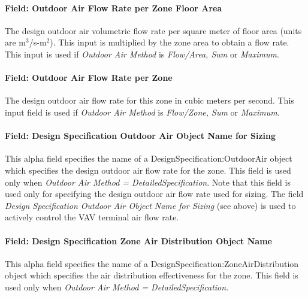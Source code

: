 \paragraph{Field: Outdoor Air Flow Rate per Zone Floor Area}\label{field-outdoor-air-flow-rate-per-zone-floor-area-10}

The design outdoor air volumetric flow rate per square meter of floor area (units are m\(^{3}\)/s-m\(^{2}\)). This input is multiplied by the zone area to obtain a flow rate. This input is used if \emph{Outdoor Air Method} is \emph{Flow/Area, Sum} or \emph{Maximum}.

\paragraph{Field: Outdoor Air Flow Rate per Zone}\label{field-outdoor-air-flow-rate-per-zone-10}

The design outdoor air flow rate for this zone in cubic meters per second. This input field is used if \emph{Outdoor Air Method} is \emph{Flow/Zone, Sum} or \emph{Maximum}.

\paragraph{Field: Design Specification Outdoor Air Object Name for Sizing}\label{field-design-specification-outdoor-air-object-name-for-sizing-1}

This alpha field specifies the name of a DesignSpecification:OutdoorAir object which specifies the design outdoor air flow rate for the zone. This field is used only when \emph{Outdoor Air Method = DetailedSpecification}. Note that this field is used only for specifying the design outdoor air flow rate used for sizing. The field \emph{Design Specification Outdoor Air Object Name for Sizing} (see above) is used to actively control the VAV terminal air flow rate.

\paragraph{Field: Design Specification Zone Air Distribution Object Name}\label{field-design-specification-zone-air-distribution-object-name-9}

This alpha field specifies the name of a DesignSpecification:ZoneAirDistribution object which specifies the air distribution effectiveness for the zone. This field is used only when \emph{Outdoor Air Method = DetailedSpecification}.

